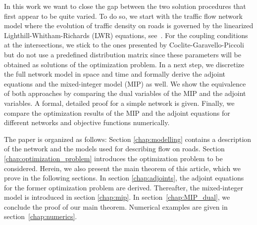 In this work we want to close the gap between the two solution procedures that first appear to be quite varied.
To do so, we start with the traffic flow network model where the evolution of traffic density on roads is governed by
the linearized Lighthill-Whitham-Richards (LWR) equations, see~\cite{DApiceManzoPiccoli2006}.
For the coupling conditions at the intersections, we stick to the ones presented by Coclite-Garavello-Piccoli~\cite{CoclitePiccoli} 
but do not use a predefined distribution matrix since these parameters will be obtained as solutions of the optimization problem.
In a next step, we discretize the full network model in space and time and formally derive the adjoint equations and the mixed-integer
model (MIP) as well. We show the equivalence of both approaches by comparing the dual variables of the MIP and the adjoint variables. 
A formal, detailed proof for a simple network is given. Finally, we compare the optimization results of the MIP and the adjoint equations 
for different networks and objective functions numerically.

The paper is organized as follows: Section \ref{chap:modelling} contains a description of the network and the models used for describing flow on roads. 
Section \ref{chap:optimization_problem} introduces the optimization problem to be considered. Herein, we also present the main theorem of this article, which we prove in the following sections. 
In section \ref{chap:adjoints}, the adjoint equations for the former optimization problem are derived. %
Thereafter, the mixed-integer model is introduced in section \ref{chap:mip}. In section~\ref{chap:MIP_dual}, we conclude
the proof of our main theorem. Numerical examples are given in section~\ref{chap:numerics}. 


